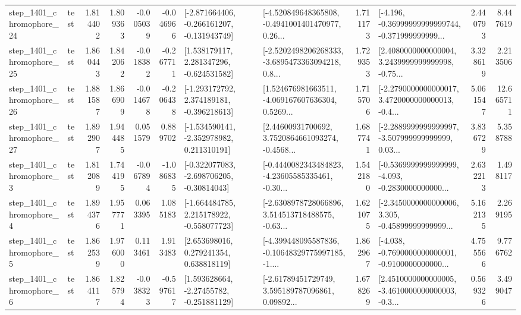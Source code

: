 \begin{tabular}{llrrrrllrlrr}
 step\_1401\_chromophore\_24 &      test &      1.814402 &    1.809363 &     -0.005039 & -0.046966 &  [-2.871664406, -0.266161207, -0.131943749] &  [-4.520849648365808, -0.4941001401470977, 0.26... &       1.711173 &  [-4.196, -0.36999999999999744, -0.371999999999... &            2.440793 &          8.447619 \\
 step\_1401\_chromophore\_25 &      test &      1.860443 &    1.842062 &     -0.018382 & -0.267711 &    [1.538179117, 2.281347296, -0.624531582] &  [-2.5202498206268333, -3.6895473363094218, 0.8... &       1.729353 &  [2.4080000000000004, 3.2439999999999998, -0.75... &            3.328619 &          2.213506 \\
 step\_1401\_chromophore\_26 &      test &      1.881587 &    1.866909 &     -0.014678 & -0.206438 &   [-1.293172792, 2.374189181, -0.396218613] &  [1.524676981663511, -4.069167607636304, 0.5269... &       1.715706 &  [-2.2790000000000017, 3.4720000000000013, -0.4... &            5.061547 &         12.665711 \\
 step\_1401\_chromophore\_27 &      test &      1.892907 &    1.944485 &      0.051579 &  0.889702 &   [-1.534590141, -2.352978982, 0.211310191] &  [2.44600931700692, 3.7520864661093274, -0.4568... &       1.687741 &  [-2.2889999999999997, -3.507999999999999, 0.03... &            3.836729 &          5.358788 \\
  step\_1401\_chromophore\_3 &      test &      1.812089 &    1.744195 &     -0.067894 & -1.086835 &   [-0.322077083, -2.698706205, -0.30814043] &  [-0.4440082343484823, -4.23605585335461, -0.30... &       1.542180 &  [-0.5369999999999999, -4.093, -0.2830000000000... &            2.632213 &          1.498117 \\
  step\_1401\_chromophore\_4 &      test &      1.894376 &    1.957771 &      0.063395 &  1.085183 &   [-1.664484785, 2.215178922, -0.558077723] &  [-2.6308978728066896, 3.514513718488575, -0.63... &       1.621075 &  [-2.3450000000000006, 3.305, -0.45899999999999... &            5.162135 &          2.269195 \\
  step\_1401\_chromophore\_5 &      test &      1.862539 &    1.976000 &      0.113461 &  1.913483 &     [2.653698016, 0.279241354, 0.638818119] &  [-4.399448095587836, -0.10648329775997185, -1.... &       1.862967 &  [-4.038, -0.7690000000000001, -0.9100000000000... &            4.755566 &          9.776762 \\
  step\_1401\_chromophore\_6 &      test &      1.864117 &    1.825794 &     -0.038323 & -0.597617 &    [1.593628664, -2.27455782, -0.251881129] &  [-2.61789451729749, 3.595189787096861, 0.09892... &       1.678269 &  [2.4510000000000005, -3.4610000000000003, -0.3... &            0.569326 &          3.499047 \\

\end{tabular}
